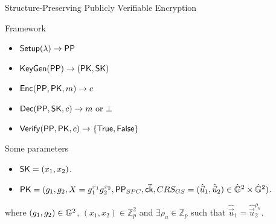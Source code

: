 \begin{frame}{Structure-Preserving Publicly Verifiable Encryption}
  \begin{block}{Framework}
    \begin{itemize}
    \item ${\mathsf{Setup}}(\lambda) \to \mathsf{PP}$
    \item ${\mathsf{KeyGen}}(\mathsf{PP}) \to (\mathsf{PK}, \mathsf{SK})$
    \item ${\mathsf{Enc}}(\mathsf{PP}, \mathsf{PK}, m) \to c$
    \item ${\mathsf{Dec}}(\mathsf{PP}, \mathsf{SK}, c) \to m \mbox{ or } \bot$
    \item ${\mathsf{Verify}}(\mathsf{PP}, \mathsf{PK}, c) \to \{\mathsf{True}, \mathsf{False}\}$
    \end{itemize}
  \end{block}

  \begin{block}{Some parameters}
    
    \begin{itemize}
    \item $\mathsf{SK} = (x_1, x_2)$.
    \item $\mathsf{PK} = (g_1, g_2, X = g_1^{x_1}g_2^{x_2}, \mathsf{PP}_{SPC}, \vec{\mathsf{ck}}, CRS_{GS} = (\hat{\vec{u}}_1, \hat{\vec{u}}_2) \in \hat{\mathbb{G}}^2 \times \hat{\mathbb{G}}^2)$.
    \end{itemize}
    where $(g_1, g_2) \in \mathbb{G}^2$, $(x_1, x_2) \in \mathbb{Z}_p^2$ and $\exists \rho_u \in \mathbb{Z}_p$ such that $\hat{\vec{u}}_1 = \hat{\vec{u}}_2^{\rho_u}$.
  \end{block}
  
\end{frame}

